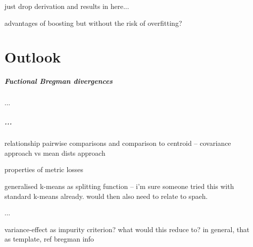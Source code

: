 \documentclass[
    a4paper, %
	fontsize=10pt, %
	twoside=false, %
]{kaobook}
\begin{document}
just drop derivation and results in here...

advantages of boosting but without the risk of overfitting?

\chapter{Outlook}

\paragraph{Fuctional Bregman divergences} ...

\paragraph{...}

relationship pairwise comparisons and comparison to centroid -- covariance approach vs mean dists approach

properties of metric losses

generalised k-means as splitting function -- i'm sure someone tried this with standard k-means already. would then also need to relate to spaeh.

...

variance-effect as impurity criterion? what would this reduce to? in general, that as template, ref bregman info


\backmatter %



\printbibliography[heading=bibintoc, title=Bibliography, prenote=bibnote] %



\printindex %
\end{document}
